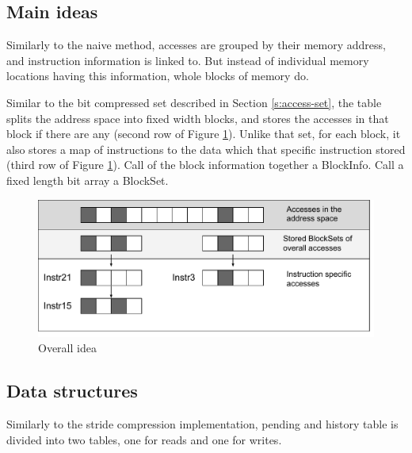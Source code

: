 \documentclass[12pt,twoside]{reedthesis}
\begin{document}
			
			\subsection{Main ideas}
			
			Similarly to the naive method, accesses are grouped by their memory address, and instruction information is linked to. But instead of individual memory locations having this information, whole blocks of memory do. %
			
			Similar to the bit compressed set described in Section \ref{s:access-set}, the table splits the address space into fixed width blocks, and stores the accesses in that block if there are any (second row of Figure \ref{fig:bit-idea}). Unlike that set, for each block, it also stores a map of instructions to the data which that specific instruction stored (third row of Figure \ref{fig:bit-idea}). Call of the block information together a BlockInfo. Call a fixed length bit array a BlockSet. 
			
			\begin{figure}[h]
				\caption{Overall idea}
				\label{fig:bit-idea}
				\includegraphics[scale=0.85]{BlockSet_accesses.pdf}
			\end{figure}
			
			\subsection{Data structures}
			
			Similarly to the stride compression implementation, pending and history table is divided into two tables, one for reads and one for writes. %
			
			
\end{document}
